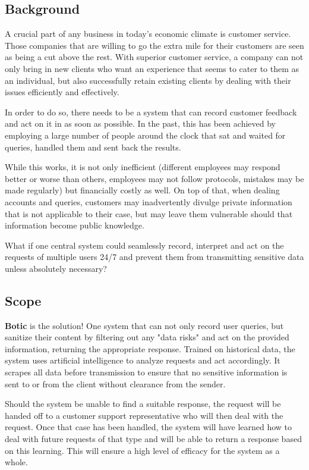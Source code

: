 \documentclass[11pt]{article}
\begin{document}
\subsection{Background}
A crucial part of any business in today's economic climate is customer service. Those companies that are willing to go the extra mile for their customers are seen as being a cut above the rest. With superior customer service, a company can not only bring in new clients who want an experience that seems to cater to them as an individual, but also successfully retain existing clients by dealing with their issues efficiently and effectively.\par
In order to do so, there needs to be a system that can record customer feedback and act on it in as soon as possible. In the past, this has been achieved by employing a large number of people around the clock that sat and waited for queries, handled them and sent back the results.\par

While this works, it is not only inefficient (different employees may respond better or worse than others, employees may not follow protocols, mistakes may be made regularly) but financially costly as well. On top of that, when dealing accounts and queries, customers may inadvertently divulge private information that is not applicable to their case, but may leave them vulnerable should that information become public knowledge.\par

What if one central system could seamlessly record, interpret and act on the requests of multiple users 24/7 and prevent them from transmitting sensitive data unless absolutely necessary?\par

\subsection{Scope}
\textbf{Botic} is the solution! One system that can not only record user queries, but sanitize their content by filtering out any "data risks" and act on the provided information, returning the appropriate response. Trained on historical data, the system uses artificial intelligence to analyze requests and act accordingly. It scrapes all data before transmission to ensure that no sensitive information is sent to or from the client without clearance from the sender.\par

Should the system be unable to find a suitable response, the request will be handed off to a customer support representative who will then deal with the request. Once that case has been handled, the system will have learned how to deal with future requests of that type and will be able to return a response based on this learning. This will ensure a high level of efficacy for the system as a whole.\par
\end{document}
